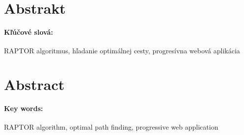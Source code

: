 \documentclass[12pt, oneside]{book}
\begin{document}

\newpage 
\section*{Abstrakt}


\paragraph*{Kľúčové slová:} 
RAPTOR algoritmus, hľadanie optimálnej cesty, progresívna webová aplikácia


\newpage 
\section*{Abstract}

\paragraph*{Key words:}
RAPTOR algorithm, optimal path finding, progressive web application


\newpage 

\tableofcontents



\newpage 

\listoffigures
\listoftables


\mainmatter


 



% 











\newpage	

\backmatter

\thispagestyle{empty}
\nocite{*}
\clearpage


 



%
%
%
%
\end{document}
